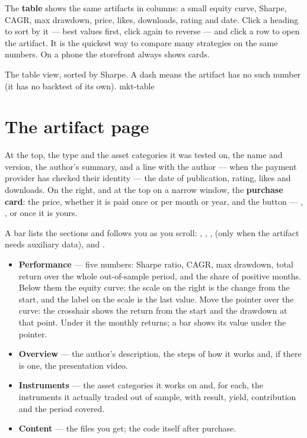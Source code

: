 The \textbf{table} shows the same artifacts in columns: a small equity
curve, Sharpe, CAGR, max drawdown, price, likes, downloads, rating and date.
Click a heading to sort by it --- best values first, click again to
reverse --- and click a row to open the artifact. It is the quickest way to
compare many strategies on the same numbers. On a phone the storefront
always shows cards.

  {The table view, sorted by Sharpe. A dash means the artifact has no such
   number (it has no backtest of its own).}
  {mkt-table}

\section{The artifact page}\label{sez:artifact-page}

At the top, the type and the asset categories it was tested on, the name
and version, the author's summary, and a line with the author ---
 when the payment provider has checked their identity
--- the date of publication, rating, likes and downloads. On the right, and at the top on a
narrow window, the \textbf{purchase card}: the price, whether it is paid once
or per month or year, and the button --- ,
, or  once it is
yours.

A bar lists the sections and follows you as you scroll: ,
, ,  (only when the artifact
needs auxiliary data),  and .

\begin{itemize}
  \item \textbf{Performance} --- five numbers: Sharpe ratio, CAGR, max
        drawdown, total return over the whole out-of-sample period, and the
        share of positive months. Below them the equity curve: the scale on
        the right is the change from the start, and the label on the scale
        is the last value. Move the pointer over the curve: the crosshair
        shows the return from the start and the drawdown at that point.
        Under it the monthly returns; a bar shows its value under the
        pointer.
  \item \textbf{Overview} --- the author's description, the steps of how it
        works and, if there is one, the presentation video.
  \item \textbf{Instruments} --- the asset categories it works on and, for
        each, the instruments it actually traded out of sample, with result,
        yield, contribution and the period covered.
  \item \textbf{Content} --- the files you get; the code itself after
        purchase.
\end{itemize}

